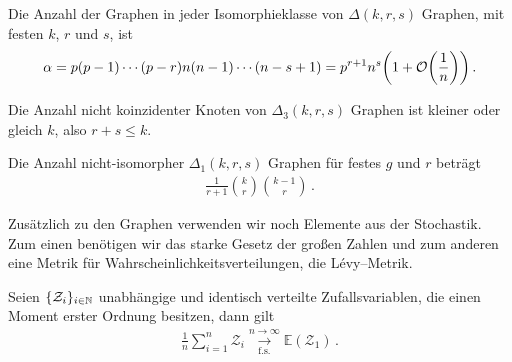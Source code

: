 \documentclass[../Bachelor_LennartKoliwer.tex]{subfiles}
\begin{document}
\begin{lemma}\label{lem:AnzahlIsomklasse}
    Die Anzahl der Graphen in jeder Isomorphieklasse von $\Delta(k,r,s)$ Graphen, mit festen $k$, $r$ und $s$, ist
    \begin{align*}
        \alpha = p(p-1)\cdots(p-r)n(n-1)\cdots(n-s+1)=p^{r+1}n^s\lr{1+\mathcal{O}\lr{\frac1n}}\,.
    \end{align*}
\end{lemma}

\begin{lemma}\label{lem:AnzahlNichtKoinzidenterKnotenKateg3}
    Die Anzahl nicht koinzidenter Knoten von $\Delta_3(k,r,s)$ Graphen ist kleiner oder gleich $k$, also $r+s\leq k$. 
\end{lemma}

\begin{lemma}\label{AnzahlKateg1Graphen}
    Die Anzahl nicht-isomorpher $\Delta_1(k,r,s)$ Graphen für festes $g$ und $r$ beträgt
    \begin{align*}
        \frac{1}{r+1}\binom{k}{r}\binom{k-1}{r}\,.
    \end{align*}
\end{lemma}

















Zusätzlich zu den Graphen verwenden wir noch Elemente aus der Stochastik.
Zum einen benötigen wir das starke Gesetz der großen Zahlen und zum anderen eine Metrik für Wahrscheinlichkeitsverteilungen, die Lévy--Metrik.

\begin{theorem}\label{theo:StarkeGroßeZahlen}
    Seien $\{\mathcal{Z}_i\}_{i\in\mathbb{N}}$ unabhängige und identisch verteilte Zufallsvariablen, die einen Moment erster Ordnung besitzen, dann gilt 
    \begin{align*}
        \frac{1}{n}\sum_{i=1}^{n}\mathcal{Z}_i \underset{\text{f.s.}}{\overset{n\to\infty}{\longrightarrow}} \mathbb{E}(\mathcal{Z}_1)\,.
    \end{align*}   
\end{theorem}
\end{document}
